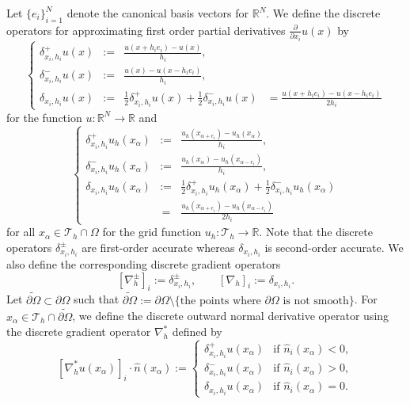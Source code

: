 \documentclass[12pt, reqno]{amsart}
\numberwithin{equation}{section}
\newcommand{\Om}{\Omega}
\newcommand{\p}{\partial}
\begin{document}
Let $\{e_i\}_{i=1}^N$ denote the canonical basis vectors for $\mathbb{R}^N$. We define the discrete operators for approximating first order partial derivatives 
$\frac{\partial}{\partial x_i} u(x)$ by
\begin{equation}\label{cdiff}
\left\{ \begin{array}{rcll}
\delta^+_{x_i,h_i}u({x}) & := &\frac{u({x}+h_ie_i)-u({x})}{h_i},\\
\delta^-_{x_i,h_i}u({x}) &:= &\frac{u({x})-u({x}-h_ie_i)}{h_i},\\
\delta_{x_i,h_i}u({x}) &:= &\frac12 \delta^+_{x_i, h_i} u(x) + \frac12 \delta^-_{x_i, h_i} u(x) & = \frac{u({x}+h_i e_i)-u({x}-h_ie_i)}{2h_i}
 \end{array}\right.
\end{equation} 
for the function $u:\mathbb{R}^N \to \mathbb{R}$ and 
\begin{equation}\label{grid}
\left\{ \begin{array}{rcl}
\delta^+_{x_i,h_i}u_{h}(x_{\alpha})
&:=&\frac{u_{h}(x_{\alpha+e_i})-u_{h}(x_{\alpha})}{h_i},\\
\delta^-_{x_i,h_i}u_{h}(x_{\alpha}) &:=&\frac{u_{h}(x_{\alpha})-u_{h}(x_{\alpha-e_i})}{h_i},\\
\delta_{x_i,h_i}u_h({x_{\alpha}}) &:= &\frac12 \delta^+_{x_i, h_i} u_h(x_{\alpha}) + \frac12 \delta^-_{x_i, h_i} u_h(x_{\alpha}) \\ &\,=& \frac{u_{h}(x_{\alpha+e_i})-u_{h}(x_{\alpha-e_i})}{2h_i}
 \end{array}\right. 
\end{equation}  for all $x_{\alpha} \in \mathcal{T}_h \cap \Omega$ for the grid function $u_h:\mathcal{T}_h\to \mathbb{R}$. Note that the discrete operators $\delta^\pm_{x_i,h_i}$ are first-order accurate whereas $\delta_{x_i,h_i}$ is second-order accurate. 
We also define the corresponding discrete gradient operators 
\[
[\nabla^\pm_h]_i  := \delta^\pm_{x_i, h_i}  , \qquad 
[\nabla_h]_i := \delta_{x_i, h_i}.
\]
Let $\widetilde{\partial \Omega} \subset \partial \Omega $  such that $\widetilde{\partial \Omega}:= \p\Om \setminus \{\mbox{the points where }\partial \Om \mbox{ is not smooth}\}$. For $x_\alpha \in \mathcal{T}_h \cap \widetilde{\partial \Omega}$, we define the discrete outward normal derivative operator using the discrete gradient operator $\nabla^*_{h}$ defined by 
\[
[\nabla^*_h u(x_\alpha)]_i \cdot \widehat{n}(x_\alpha) := \begin{cases}
\delta_{x_i, h_i}^+ u(x_\alpha)& \text{if } \widehat{n}_i(x_\alpha) < 0 , \\ 
\delta_{x_i, h_i}^- u(x_\alpha)& \text{if } \widehat{n}_i(x_\alpha) > 0 , \\ 
\delta_{x_i, h_i} u(x_\alpha) & \text{if } \widehat{n}_i(x_\alpha) = 0 . 
\end{cases}
\]
\end{document}
